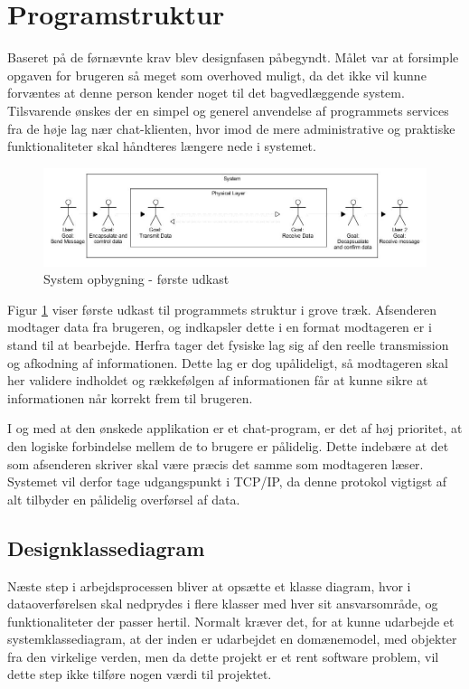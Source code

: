 \section{Programstruktur}
Baseret på de førnævnte krav blev designfasen påbegyndt. Målet var at forsimple opgaven for brugeren så meget som overhoved muligt, da det ikke vil kunne forvæntes at denne person kender noget til det bagvedlæggende system. 
Tilsvarende ønskes der en simpel og generel anvendelse af programmets services fra de høje lag nær chat-klienten, hvor imod de mere administrative og praktiske funktionaliteter skal håndteres længere nede i systemet.

\begin{figure}[h!]
\centering
\includegraphics[scale=0.5]{Billeder/ProgramOpbygning1.JPG}
\caption{System opbygning - første udkast}
\label{fig:Blokdiagram}
\end{figure}

Figur \ref{fig:Blokdiagram} viser første udkast til programmets struktur i grove træk. Afsenderen modtager data fra brugeren, og indkapsler dette i en format modtageren er i stand til at bearbejde. Herfra tager det fysiske lag sig af den reelle transmission og afkodning af informationen. Dette lag er dog upålideligt, så modtageren skal her validere indholdet og rækkefølgen af informationen får at kunne sikre at informationen når korrekt frem til brugeren. 

I og med at den ønskede applikation er et chat-program, er det af høj prioritet, at den logiske forbindelse mellem de to brugere er pålidelig. Dette indebære at det som afsenderen skriver skal være præcis det samme som modtageren læser. Systemet vil derfor tage udgangspunkt i TCP/IP, da denne protokol vigtigst af alt tilbyder en pålidelig overførsel af data. 


\subsection{Designklassediagram}
Næste step i arbejdsprocessen bliver at opsætte et klasse diagram, hvor i dataoverførelsen skal nedprydes i flere klasser med hver sit ansvarsområde, og funktionaliteter der passer hertil. Normalt kræver det, for at kunne udarbejde et systemklassediagram, at der inden er udarbejdet en domænemodel, med objekter fra den virkelige verden, men da dette projekt er et rent software problem, vil dette step ikke tilføre nogen værdi til projektet. 

